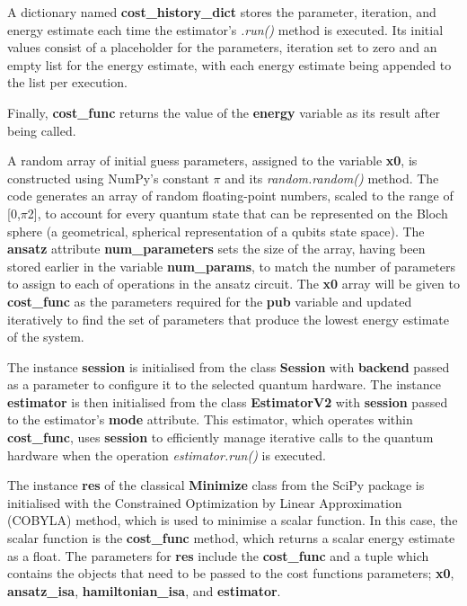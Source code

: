\documentclass{article}
\begin{document}
{A dictionary named \textbf{cost\_history\_dict} stores the parameter, iteration, and energy estimate each time the estimator's \textit{.run()} method is executed. Its initial values consist of a placeholder for the parameters, iteration set to zero and an empty list for the energy estimate, with each energy estimate being appended to the list per execution. 

Finally, \textbf{cost\_func} returns the value of the \textbf{energy} variable as its result after being called.

A random array of initial guess parameters, assigned to the variable \textbf{x0}, is constructed using NumPy’s constant $\pi$ and its \textit{random.random()} method. The code generates an array of random floating-point numbers, scaled to the range of [0,$\pi$2], to account for every quantum state that can be represented on the Bloch sphere (a geometrical, spherical representation of a qubits state space\cite{blocsphere}). The \textbf{ansatz} attribute \textbf{num\_parameters} sets the size of the array, having been stored earlier in the variable \textbf{num\_params}, to match the number of parameters to assign to each of operations in the ansatz circuit. The \textbf{x0} array will be given to \textbf{cost\_func} as the parameters required for the \textbf{pub} variable and updated iteratively to find the set of parameters that produce the lowest energy estimate of the system.

The instance \textbf{session} is initialised from the class \textbf{Session} with \textbf{backend} passed as a parameter to configure it to the selected quantum hardware. The instance \textbf{estimator} is then initialised from the class \textbf{EstimatorV2} with \textbf{session} passed to the estimator's \textbf{mode} attribute. This estimator, which operates within \textbf{cost\_func}, uses \textbf{session} to efficiently manage iterative calls to the quantum hardware when the operation \textit{estimator.run()} is executed\cite{Session}.

The instance \textbf{res} of the classical \textbf{Minimize} class from the SciPy package is initialised with the Constrained Optimization by Linear Approximation (COBYLA) method, which is used to minimise a scalar function\cite{Minimize}. In this case, the scalar function is the \textbf{cost\_func} method, which returns a scalar energy estimate as a float. The parameters for \textbf{res} include the \textbf{cost\_func} and a tuple which contains the objects that need to be passed to the cost functions parameters; \textbf{x0}, \textbf{ansatz\_isa}, \textbf{hamiltonian\_isa}, and \textbf{estimator}.

}
\end{document}
